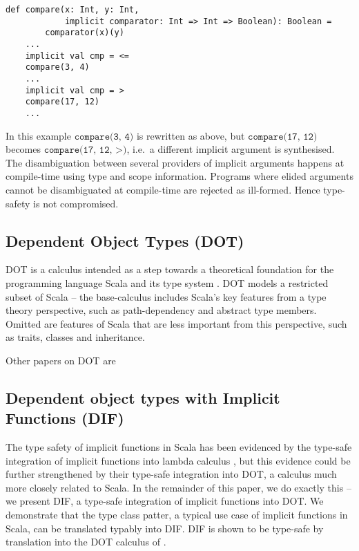 \begin{minipage}{\linewidth}
\begin{lstlisting}[mathescape]
    def compare(x: Int, y: Int,
            implicit comparator: Int => Int => Boolean): Boolean =
        comparator(x)(y)
    ...
    implicit val cmp = <=
    compare(3, 4)
    ...
    implicit val cmp = >
    compare(17, 12)
    ...
\end{lstlisting}
\end{minipage}

In this example $\texttt{compare(3, 4)}$ is rewritten as above, but
$\texttt{compare(17, 12)}$ becomes $\texttt{compare(17, 12, >)}$, i.e.~a
different implicit argument is synthesised. The disambiguation between several
providers of implicit arguments happens at compile-time using type and scope
information. Programs where elided arguments cannot be disambiguated at
compile-time are rejected as ill-formed. Hence type-safety is not compromised.

\subsection{Dependent Object Types (DOT)}

DOT is a calculus intended as a step towards a theoretical foundation for the
programming language Scala and its type system \cite{AMO12}. DOT models a
restricted subset of Scala -- the base-calculus includes Scala's key features
from a type theory perspective, such as path-dependency and abstract type
members. Omitted are features of Scala that are less important from this
perspective, such as traits, classes and inheritance.

Other papers on DOT are \cite{ARO14, AR17, AR16}

\subsection{Dependent object types with Implicit Functions (DIF)}

The type safety of implicit functions in Scala has been evidenced by the
type-safe integration of implicit functions into lambda calculus \cite{OBLB18},
but this evidence could be further strengthened by their type-safe integration
into DOT, a calculus much more closely related to Scala. In the remainder of
this paper, we do exactly this -- we present DIF, a type-safe integration of
implicit functions into DOT. We demonstrate that the type class patter, a
typical use case of implicit functions in Scala, can be translated typably into
DIF. DIF is shown to be type-safe by translation into the DOT calculus of
\cite{AGORS16}.


